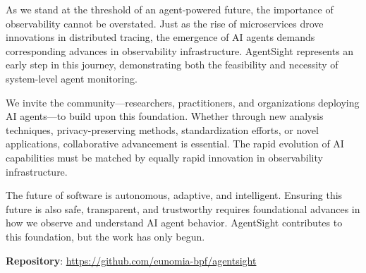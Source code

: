 \documentclass[sigplan,screen，review,9pt]{acmart}
\begin{document}
As we stand at the threshold of an agent-powered future, the importance of observability cannot be overstated. Just as the rise of microservices drove innovations in distributed tracing, the emergence of AI agents demands corresponding advances in observability infrastructure. AgentSight represents an early step in this journey, demonstrating both the feasibility and necessity of system-level agent monitoring.

We invite the community—researchers, practitioners, and organizations deploying AI agents—to build upon this foundation. Whether through new analysis techniques, privacy-preserving methods, standardization efforts, or novel applications, collaborative advancement is essential. The rapid evolution of AI capabilities must be matched by equally rapid innovation in observability infrastructure.

The future of software is autonomous, adaptive, and intelligent. Ensuring this future is also safe, transparent, and trustworthy requires foundational advances in how we observe and understand AI agent behavior. AgentSight contributes to this foundation, but the work has only begun.

\textbf{Repository}: \url{https://github.com/eunomia-bpf/agentsight}



\end{document}
